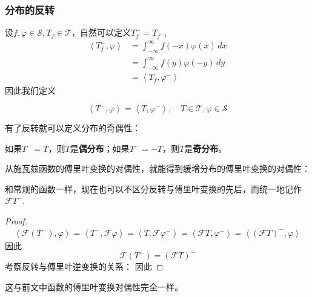 \subsubsection{分布的反转}

设$f,\varphi\in\mathcal{S} ,T_f\in\mathcal{T} $，自然可以定义$T_f^-=T_{f^-}$,
\begin{align*}
    \left\langle T_f^-,\varphi\right\rangle & =\int_{-\infty}^{\infty}f(-x)\varphi(x)\,dx \\
                                 & =\int_{-\infty}^{\infty}f(y)\varphi(-y)\,dy \\
                                 & =\left\langle T_f,\varphi^-\right\rangle
\end{align*}
因此我们定义\begin{definition}[分布的反转]
    \begin{equation*}
    \left\langle T^-,\varphi\right\rangle=\left\langle T,\varphi^-\right\rangle,\quad T\in\mathcal{T} ,\varphi\in\mathcal{S}
\end{equation*}
\end{definition}

有了反转就可以定义分布的奇偶性：
\begin{definition}[分布的奇偶性]
    如果$T^-=T$，则$T$是\textbf{偶分布}；如果$T^-=-T$，则$T$是\textbf{奇分布}。
\end{definition}

从施瓦兹函数的傅里叶变换的对偶性，就能得到缓增分布的傅里叶变换的对偶性：
\begin{theorem}[分布傅里叶变换的对偶性]
    \quad
\end{theorem}
和常规的函数一样，现在也可以不区分反转与傅里叶变换的先后，而统一地记作$\mathcal{F} T^-$.
\begin{proof}
    \begin{align*}
    \left\langle\mathcal{F}(T^-),\varphi\right\rangle=\left\langle T^-,\mathcal{F}\varphi\right\rangle=\left\langle T,\mathcal{F} \varphi^-\right\rangle=\left\langle\mathcal{F}T,\varphi^-\right\rangle=\left\langle(\mathcal{F}T)^-,\varphi\right\rangle
\end{align*}
因此
$$\mathcal{F}(T^-)= (\mathcal{F}T)^-$$
考察反转与傅里叶逆变换的关系：
因此
\end{proof}
这与前文中函数的傅里叶变换对偶性完全一样。

